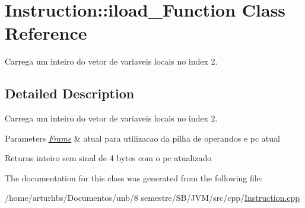 \hypertarget{classInstruction_1_1iload__2Function}{}\section{Instruction\+:\+:iload\+\_\+Function Class Reference}
\label{classInstruction_1_1iload__2Function}


Carrega um inteiro do vetor de variaveis locais no index 2.  




\subsection{Detailed Description}
Carrega um inteiro do vetor de variaveis locais no index 2. 


\begin{DoxyParams}{Parameters}
{\em \hyperlink{classFrame}{Frame}} & atual para utilizacao da pilha de operandos e pc atual \\
\hline
\end{DoxyParams}
\begin{DoxyReturn}{Returns}
inteiro sem sinal de 4 bytes com o pc atualizado 
\end{DoxyReturn}


The documentation for this class was generated from the following file\+:\begin{DoxyCompactItemize}
\item 
/home/arturhbs/\+Documentos/unb/8 semestre/\+S\+B/\+J\+V\+M/src/cpp/\hyperlink{Instruction_8cpp}{Instruction.\+cpp}\end{DoxyCompactItemize}
